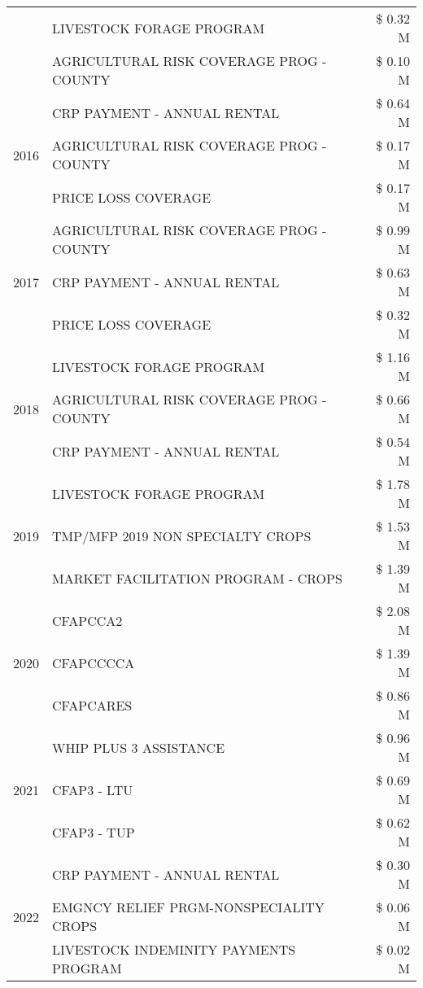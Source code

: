 \begin{tabular}{llr}
 & LIVESTOCK FORAGE PROGRAM & \$ 0.32 M \\
 & AGRICULTURAL RISK COVERAGE PROG - COUNTY & \$ 0.10 M \\
\cline{1-3}
\multirow[t]{3}{*}{2016} & CRP PAYMENT - ANNUAL RENTAL & \$ 0.64 M \\
 & AGRICULTURAL RISK COVERAGE PROG - COUNTY & \$ 0.17 M \\
 & PRICE LOSS COVERAGE & \$ 0.17 M \\
\cline{1-3}
\multirow[t]{3}{*}{2017} & AGRICULTURAL RISK COVERAGE PROG - COUNTY & \$ 0.99 M \\
 & CRP PAYMENT - ANNUAL RENTAL & \$ 0.63 M \\
 & PRICE LOSS COVERAGE & \$ 0.32 M \\
\cline{1-3}
\multirow[t]{3}{*}{2018} & LIVESTOCK FORAGE PROGRAM & \$ 1.16 M \\
 & AGRICULTURAL RISK COVERAGE PROG - COUNTY & \$ 0.66 M \\
 & CRP PAYMENT - ANNUAL RENTAL & \$ 0.54 M \\
\cline{1-3}
\multirow[t]{3}{*}{2019} & LIVESTOCK FORAGE PROGRAM & \$ 1.78 M \\
 & TMP/MFP 2019 NON SPECIALTY CROPS & \$ 1.53 M \\
 & MARKET FACILITATION PROGRAM - CROPS & \$ 1.39 M \\
\cline{1-3}
\multirow[t]{3}{*}{2020} & CFAPCCA2 & \$ 2.08 M \\
 & CFAPCCCCA & \$ 1.39 M \\
 & CFAPCARES & \$ 0.86 M \\
\cline{1-3}
\multirow[t]{3}{*}{2021} & WHIP PLUS 3 ASSISTANCE & \$ 0.96 M \\
 & CFAP3 - LTU & \$ 0.69 M \\
 & CFAP3 - TUP & \$ 0.62 M \\
\cline{1-3}
\multirow[t]{3}{*}{2022} & CRP PAYMENT - ANNUAL RENTAL & \$ 0.30 M \\
 & EMGNCY RELIEF PRGM-NONSPECIALITY CROPS & \$ 0.06 M \\
 & LIVESTOCK INDEMINITY PAYMENTS PROGRAM & \$ 0.02 M \\
\cline{1-3}
\bottomrule
\end{tabular}
